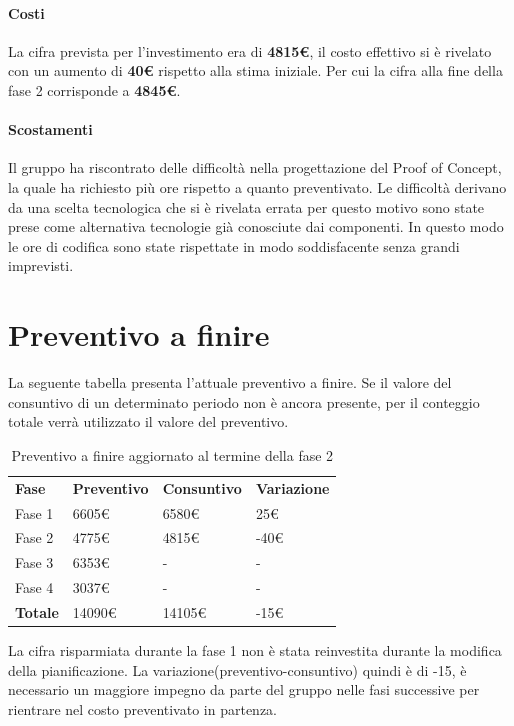 		\paragraph{Costi\\}
La cifra prevista per l'investimento era di \textbf{4815€}, il costo effettivo si è rivelato con un aumento di \textbf{40€} rispetto alla stima iniziale. Per cui la cifra alla fine della fase 2 corrisponde a \textbf{4845€}.
 		
		\paragraph{Scostamenti\\}
Il gruppo ha riscontrato delle difficoltà nella progettazione del Proof of Concept, la quale ha richiesto più ore rispetto a quanto preventivato. Le difficoltà derivano da una scelta tecnologica che si è rivelata errata per questo motivo sono state prese come alternativa tecnologie già conosciute dai componenti. In questo modo le ore di codifica sono state rispettate in modo soddisfacente senza grandi imprevisti.

\section{Preventivo a finire}
La seguente tabella presenta l'attuale preventivo a finire. Se il valore del consuntivo di un determinato periodo non è ancora presente, per il conteggio totale verrà utilizzato il valore del preventivo.

\begin{table}[h]
			\centering
		\begin{tabular}{| l | l | l | l |}
			\rowcolor{LightBlue}
			\textbf{\color{white}Fase}
			& \textbf{\color{white}Preventivo}
			& \textbf{\color{white}Consuntivo}
			& \textbf{\color{white}Variazione}
			\\
			
			Fase 1 				& 6605€ 	& 6580€ & 25€\\
			Fase 2 			& 4775€ 	& 4815€ & -40€\\
			Fase 3 		& 6353€ 	& - & -\\
			Fase 4			& 3037€ 	& - & -\\
			\textbf{Totale} & 14090€ & 14105€ & -15€\\ \hline
		\end{tabular}
		\caption{Preventivo a finire aggiornato al termine della fase 2}	
\end{table}
\noindent La cifra risparmiata durante la fase 1 non è stata reinvestita durante la modifica della pianificazione. La variazione(preventivo-consuntivo) quindi è di -15, è necessario un maggiore impegno da parte del gruppo nelle fasi successive per rientrare nel costo preventivato in partenza. 


